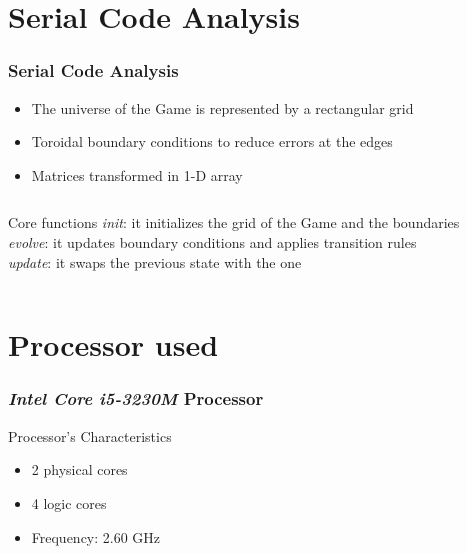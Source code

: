 \documentclass{beamer}
\begin{document}
\section{Serial Code Analysis}
\begin{frame}
	\frametitle{Serial Code Analysis}
	\begin{itemize}
		\item The universe of the Game is represented by a rectangular grid
		\item Toroidal boundary conditions to reduce errors at the edges
		\item Matrices transformed in 1-D array
	\end{itemize}

	\begin{columns}
		\begin{block}{Core functions}
			\textit{init}: it initializes the grid of the Game and the boundaries\\[0.15 cm]
			\textit{evolve}: it updates boundary conditions and applies transition rules\\[0.15 cm]
			\textit{update}: it swaps the previous state with the one
		\end{block}
	\end{columns}
\end{frame}

\section{Processor used}
\begin{frame}
	\frametitle{\emph{Intel Core i5-3230M} Processor}
	\begin{block}{Processor's Characteristics}
	\begin{itemize}
		\item 2 physical cores
		\item 4 logic cores
		\item Frequency: 2.60 GHz
	\end{itemize}
	\end{block}
\end{frame}
\end{document}
